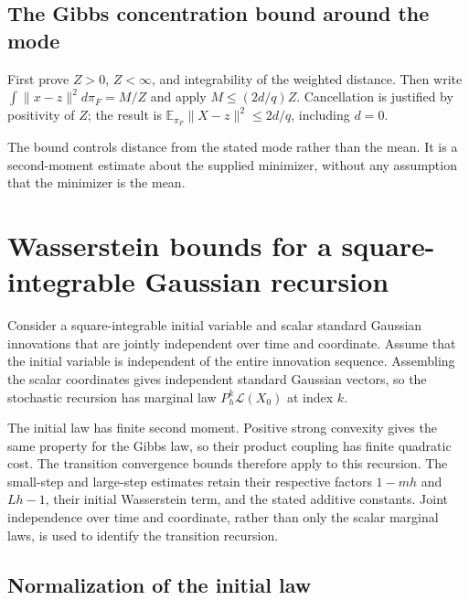 \documentclass[11pt,a4paper]{report}
\begin{document}
\subsection{\texorpdfstring{The Gibbs concentration bound around the mode}{The Gibbs concentration bound around the mode}}
\label{report-step-UnadjustedLangevin-GibbsConcentration-lean-7}


First prove \(Z>0\), \(Z<\infty\), and integrability of the weighted distance. Then write \(\int\|x-z\|^2d\pi_F=M/Z\) and apply \(M\le(2d/q)Z\). Cancellation is justified by positivity of \(Z\); the result is \(\mathbb E_{\pi_F}\|X-z\|^2\le2d/q\), including \(d=0\).



The bound controls distance from the stated mode rather than the mean. It is a second-moment estimate about the supplied minimizer, without any assumption that the minimizer is the mean.

\section{\texorpdfstring{Wasserstein bounds for a square-integrable Gaussian recursion}{Wasserstein bounds for a square-integrable Gaussian recursion}}
\label{proof-module-UnadjustedLangevin-GaussianULA-lean}


Consider a square-integrable initial variable and scalar standard Gaussian innovations that are jointly independent over time and coordinate. Assume that the initial variable is independent of the entire innovation sequence. Assembling the scalar coordinates gives independent standard Gaussian vectors, so the stochastic recursion has marginal law \(P_h^k\mathcal L(X_0)\) at index \(k\).



The initial law has finite second moment. Positive strong convexity gives the same property for the Gibbs law, so their product coupling has finite quadratic cost. The transition convergence bounds therefore apply to this recursion. The small-step and large-step estimates retain their respective factors \(1-mh\) and \(Lh-1\), their initial Wasserstein term, and the stated additive constants. Joint independence over time and coordinate, rather than only the scalar marginal laws, is used to identify the transition recursion.

\subsection{\texorpdfstring{Normalization of the initial law}{Normalization of the initial law}}
\label{report-step-UnadjustedLangevin-GaussianULA-lean-1}
\end{document}

